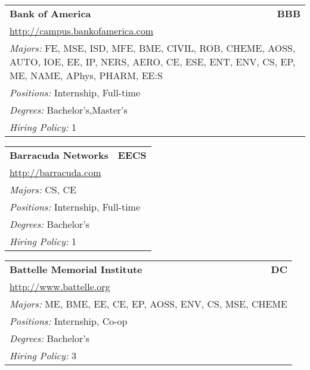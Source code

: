 \documentclass[twoside]{article}
\begin{document}
\begin{center}
\begin{multicols}{3}
\begin{FlushLeft}
\begin{minipage}{.9\columnwidth}\begin{tabularx}{.95\columnwidth}{Xr}
                 {\Large\bf Bank of America} & {\Large\bf BBB}\\
    \multicolumn{2}{p{.95\columnwidth}}{\url{http://campus.bankofamerica.com}}\\
    \multicolumn{2}{p{.95\columnwidth}}{\emph{Majors:} FE, MSE, ISD, MFE, BME, CIVIL, ROB, CHEME, AOSS, AUTO, IOE, EE, IP, NERS, AERO, CE, ESE, ENT, ENV, CS, EP, ME, NAME, APhys, PHARM, EE:S}\\
    \multicolumn{2}{p{.95\columnwidth}}{\emph{Positions:} Internship, Full-time}\\
    \multicolumn{2}{p{.95\columnwidth}}{\emph{Degrees:} Bachelor's,Master's}\\
    \multicolumn{2}{p{.95\columnwidth}}{\emph{Hiring Policy:} 1}\\
    \end{tabularx}
    
\end{minipage}
 
\begin{minipage}{.9\columnwidth}\begin{tabularx}{.95\columnwidth}{Xr}
                 {\Large\bf Barracuda Networks} & {\Large\bf EECS}\\
    \multicolumn{2}{p{.95\columnwidth}}{\url{http://barracuda.com}}\\
    \multicolumn{2}{p{.95\columnwidth}}{\emph{Majors:} CS, CE}\\
    \multicolumn{2}{p{.95\columnwidth}}{\emph{Positions:} Internship, Full-time}\\
    \multicolumn{2}{p{.95\columnwidth}}{\emph{Degrees:} Bachelor's}\\
    \multicolumn{2}{p{.95\columnwidth}}{\emph{Hiring Policy:} 1}\\
    \end{tabularx}
    
\end{minipage}
 
\begin{minipage}{.9\columnwidth}\begin{tabularx}{.95\columnwidth}{Xr}
                 {\Large\bf Battelle Memorial Institute} & {\Large\bf DC}\\
    \multicolumn{2}{p{.95\columnwidth}}{\url{http://www.battelle.org}}\\
    \multicolumn{2}{p{.95\columnwidth}}{\emph{Majors:} ME, BME, EE, CE, EP, AOSS, ENV, CS, MSE, CHEME}\\
    \multicolumn{2}{p{.95\columnwidth}}{\emph{Positions:} Internship, Co-op}\\
    \multicolumn{2}{p{.95\columnwidth}}{\emph{Degrees:} Bachelor's}\\
    \multicolumn{2}{p{.95\columnwidth}}{\emph{Hiring Policy:} 3}\\
    \end{tabularx}
    

\end{minipage}
\end{FlushLeft}
\end{multicols}
\end{center}
\end{document}
